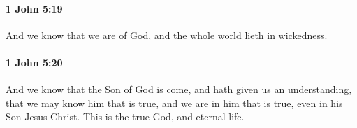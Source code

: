 		\paragraph{1 John 5:19} %
			\label{1JOHN-5-19}

			And we know that we are of God, and the whole world lieth in wickedness.

			\begin{framed}
			\scriptsize
				\begin{compactdesc}
					\item[SBLG] 
				\end{compactdesc}
			\end{framed}

		\paragraph{1 John 5:20} %
			\label{1JOHN-5-20}

			And we know that the Son of God is come, and hath given us an understanding, that we may know him that is true, and we are in him that is true, even in his Son Jesus Christ.  This is the true God, and eternal life.

